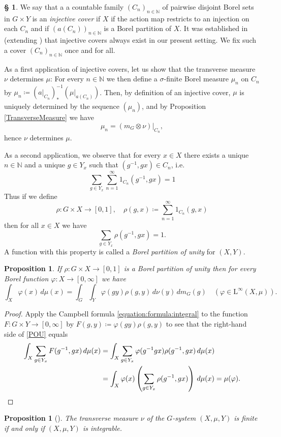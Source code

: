 \documentclass[11pt, oneside]{amsart}
\newtheorem{prop}[lemma]{Proposition}
\theoremstyle{definition}
\newtheorem{no}[lemma]{\S}
\theoremstyle{remark}
\theoremstyle{TheoremNum}
\newcommand{\Linf}{\mathrm{L}^{\infty}}
\renewcommand{\phi}{\varphi}
\newcommand{\bN}{\mathbb N}
\begin{document}
\begin{no}\label{CFPOU}  We say that a a countable family $(C_n)_{n \in \bN}$ of pairwise disjoint Borel sets in $G \times Y$ is an \emph{injective cover} if $X$ if the action map restricts to an injection on each $C_n$ and if
$(a(C_n))_{n \in \bN}$ is a Borel partition of $X$. It was established in \cite[Lemma 4.6]{ABC} (extending \cite[\S 3.1]{BHK}) that injective covers always exist in our present setting. We fix such a cover $(C_n)_{
n \in \bN}$ once and for all. 

\item As a first application of injective covers, let us show that the transverse measure $\nu$ determines $\mu$: For every $n \in \bN$ we then define a $\sigma$-finite Borel measure $\mu_n$ on $C_n$ by  $\mu_n \coloneqq (a|_{C_n})^{-1}_\ast (\mu|_{a(C_n)})$. Then, by definition of an injective cover, $\mu$ is uniquely determined by the sequence $(\mu_n)$, and by Proposition \ref{TransverseMeasure} we have
\[
\mu_n = (m_G \otimes \nu)|_{C_n},
\]
hence $\nu$ determines $\mu$.

\item As a second application, we observe that for every $x \in X$ there exists a unique $n \in \bN$ and a unique $g \in Y_x$ such that $(g^{-1}, g x) \in C_n$, i.e.
\[
 \sum_{g \in Y_x}  \sum_{n=1}^\infty 1_{C_n}(g^{-1}, g x) = 1
\]
Thus if we define
\[
\rho: G \times X \to [0,1], \quad \rho(g,x) \coloneqq \sum_{n=1}^\infty 1_{C_n}(g,x)
\]
then for all $x \in X$ we have
\begin{equation}\label{DefPOU}
\sum_{g \in Y_x} \rho(g^{-1}, g x) = 1.
\end{equation}
A function with this property is called a \emph{Borel partition of unity} for $(X,Y)$.
\end{no}
\begin{prop} If $\rho: G \times X \to [0,1]$ is a Borel partition of unity then for every Borel function $\phi: X \to [0, \infty]$ we have
 \begin{equation}\label{POU}
\int_X \phi(x) \, d \mu(x) = \int_G \int_Y \phi(g y) \rho(g,y) \, d\nu(y)\, dm_G(g) \quad (\phi \in \Linf(X, \mu)).
\end{equation}
\end{prop}
\begin{proof} Apply the Campbell formula \eqref{equation:formula:integral} to the function $F: G \times Y \to [0, \infty]$ by $F(g,y) \coloneqq \phi(g y)\rho(g,y)$ to see that the right-hand side of \eqref{POU} equals
\begin{align*}
\int_X \sum_{g \in Y_x} F(g^{-1}, g x)\, d\mu(x) &= \int_X \sum_{g \in Y_x} \phi(g^{-1}g x)\rho(g^{-1}, g x)\, d \mu(x)\\
& = \int_X \phi(x) \left(\sum_{g \in Y_x} \rho(g^{-1}, g x) \right)\, d \mu(x) = \mu(\phi).\qedhere
\end{align*}
\end{proof}
\begin{prop}[{\cite[Proposition\ 5.1]{ABC}}] The transverse measure $\nu$ of the $G$-system $(X, \mu, Y)$ is finite if and only if $(X,\mu, Y)$ is integrable.
\end{prop}
\end{document}
